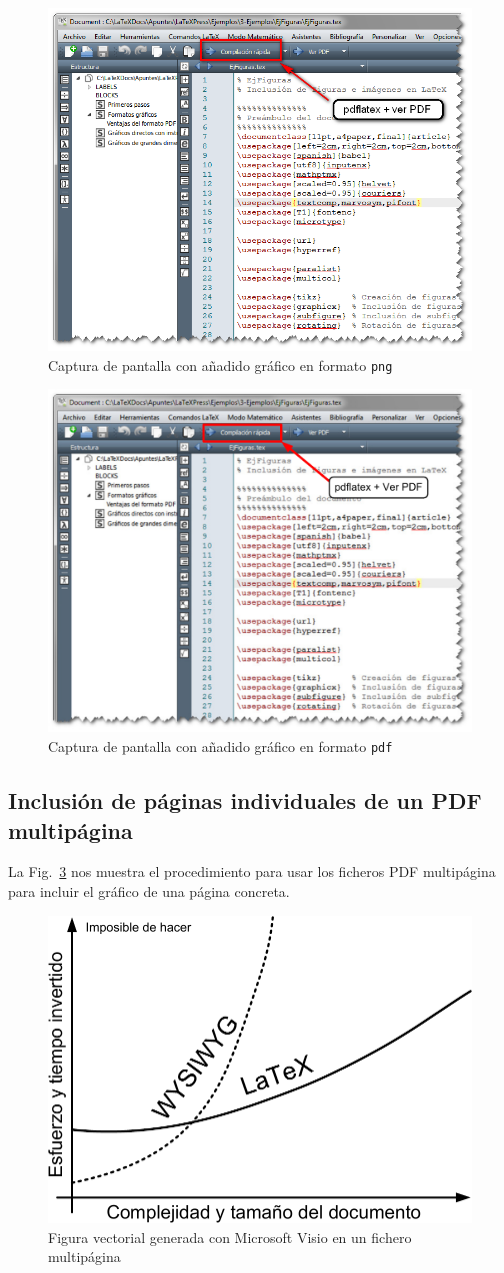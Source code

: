 \documentclass[11pt,a4paper]{article}
\begin{document}
\begin{figure}[htb]
	\centering
	\includegraphics[width=0.5\linewidth]{texmk02} 
	\caption[Captura con gráfico en \texttt{png}]{Captura de pantalla con añadido gráfico en formato \texttt{png}}
	\label{fig:texmk02}
\end{figure}

\begin{figure}[htb]
	\centering
	\includegraphics[width=0.5\linewidth]{texmk03} 
	\caption[Captura con gráfico en \texttt{pdf}]{Captura de pantalla con añadido gráfico en formato \texttt{pdf}}
	\label{fig:texmk03}
\end{figure}




\newpage
\subsection{Inclusión de páginas individuales de un PDF multipágina}

La Fig.~\ref{fig:visio_mp} nos muestra el procedimiento para usar los ficheros PDF multipágina para incluir el gráfico de una página concreta.

\begin{figure}[htb]
	\centering
	\includegraphics[page=2,width=0.5\linewidth]{visio_mp} 
	\caption[Gráfico de Visio multipágina]{Figura vectorial generada con Microsoft Visio en un fichero multipágina}
	\label{fig:visio_mp}
\end{figure}
\end{document}
